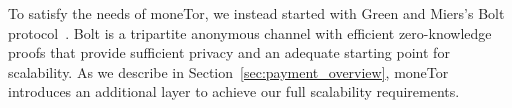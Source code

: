To satisfy the needs of moneTor, we instead started with Green and Miers's Bolt protocol~\cite{green2017bolt}.
Bolt is a tripartite anonymous channel with efficient zero-knowledge proofs that provide sufficient privacy and an adequate starting point for scalability.
As we describe in Section~\ref{sec:payment_overview}, moneTor introduces an additional layer to achieve our full scalability requirements.


